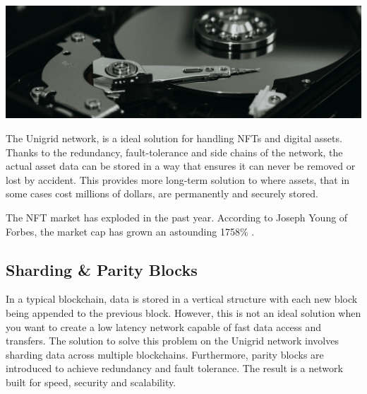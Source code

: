 \documentclass[a4paper,oneside]{article}
\begin{document}
\vspace{0.2cm}
\begin{mdframed}[style=textimage]
	\includegraphics[width=381pt]{hard-drive}
\end{mdframed}

\noindent The Unigrid network, is a ideal solution for handling NFTs and digital assets. Thanks to the redundancy, fault-tolerance and side chains of the network, the actual asset data can be stored in a way that ensures it can never be removed or lost by accident. This provides more long-term solution to where assets, that in some cases cost millions of dollars, are permanently and securely stored.

The NFT market has exploded in the past year. According to Joseph Young of Forbes, the market cap has grown an astounding 1758\% \cite{young2021}.

\subsection{Sharding \& Parity Blocks}
In a typical blockchain, data is stored in a vertical structure with each new block being appended to the previous block. However, this is not an ideal solution when you want to create a low latency network capable of fast data access and transfers. The solution to solve this problem on the Unigrid network involves sharding data across multiple blockchains. Furthermore, parity blocks are introduced to achieve redundancy and fault tolerance. The result is a network built for speed, security and scalability.
\end{document}
